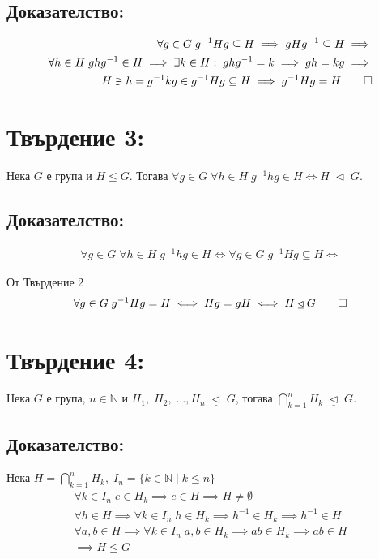 \documentclass{article}
\newcommand{\N}{\mathbb{N}}
\newcommand{\NSG}{\; \underline{\triangleleft} \;}
\begin{document}
\subsection*{Доказателство:}
\begin{align*}
\forall g \in G \; g^{-1}Hg \subseteq H \implies gHg^{-1} \subseteq H \implies \\
\forall h \in H \; ghg^{-1} \in H \implies \exists k \in H : \; ghg^{-1} = k \implies gh = kg \implies \\
H \ni h = g^{-1}kg \in g^{-1}Hg \subseteq H \implies g^{-1}Hg = H \qed
\end{align*}

\section*{Твърдение 3:}
Нека $G$ е група и $H \leq G$. Тогава $\forall g \in G \; \forall h \in H \; g^{-1}hg \in H \iff H \NSG G$.

\subsection*{Доказателство:}
\begin{align*}
\forall g \in G \; \forall h \in H \; g^{-1}hg \in H \iff \forall g \in G \; g^{-1}Hg \subseteq H \iff
\end{align*}

От Твърдение 2
\begin{align*}
\forall g \in G \; g^{-1}Hg = H \iff Hg = gH \iff H \NSG G \qed
\end{align*}

\section*{Твърдение 4:}
Нека $G$ е група, $n \in \N$ и $H_1, \; H_2, \; \dots, H_n \NSG G$, тогава $\displaystyle\bigcap_{k = 1}^n H_k \NSG G$.

\subsection*{Доказателство:}
Нека $H = \displaystyle\bigcap_{k = 1}^n H_k, \; I_n = \{k \in \N \; | \; k \leq n\}$
\begin{align*}
\forall k \in I_n \; e \in H_k \implies e \in H \implies H \neq \emptyset \\
\forall h \in H \implies \forall k \in I_n \; h \in H_k \implies h^{-1} \in H_k \implies h^{-1} \in H \\
\forall a, b \in H \implies \forall k \in I_n \; a, b \in H_k \implies ab \in H_k \implies ab \in H \\
\implies H \leq G 
\end{align*}
\end{document}
